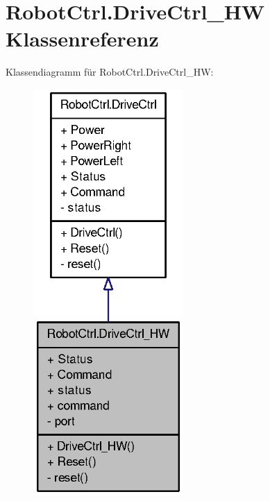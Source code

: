 \hypertarget{class_robot_ctrl_1_1_drive_ctrl___h_w}{
\section{RobotCtrl.DriveCtrl\_\-HW Klassenreferenz}
\label{class_robot_ctrl_1_1_drive_ctrl___h_w}
}


Klassendiagramm für RobotCtrl.DriveCtrl\_\-HW:\nopagebreak
\begin{figure}[H]
\begin{center}
\leavevmode
\includegraphics[width=162pt]{class_robot_ctrl_1_1_drive_ctrl___h_w__inherit__graph}
\end{center}
\end{figure}


